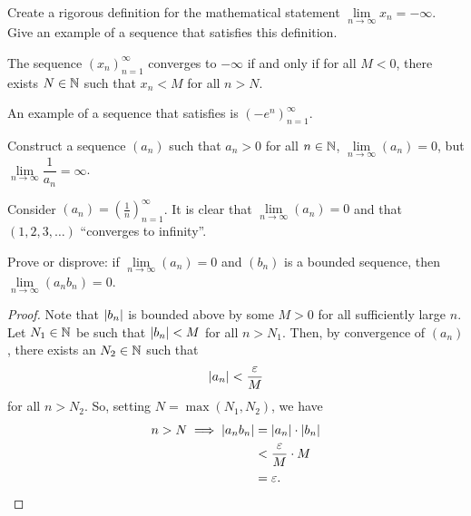 \begin{problem}
  Create a rigorous definition for the mathematical statement 
  $\lim\limits_{n \to \infty} x_{n} = -\infty$. Give an example of a 
  sequence that satisfies this definition. 

    \begin{definition}
      \label{def:convergence-to-neg-infty}
      The sequence $(x_{n})_{n=1}^{\infty}$ converges to $-\infty$ if and only if
      for all $M < 0$, there exists $N \in \mathbb{N}$ such that $x_{n} < M$ 
      for all $n > N$.
    \end{definition}

    An example of a sequence that satisfies  is
    $(-e^{n})_{n=1}^{\infty}$.
\end{problem}

\begin{problem}
  Construct a sequence $(a_{n})$ such that $a_{n} > 0$ for all $n \in \mathbb{N}$,
  $\lim\limits_{n \to \infty} (a_{n}) = 0$, but
  $\lim\limits_{n \to \infty} \dfrac{1}{a_{n}} = \infty$.

  \vspace{\baselineskip}

    Consider $(a_{n}) = \left( \frac{1}{n} \right)_{n=1}^{\infty}$. It is clear that
    $\lim\limits_{n \to \infty} (a_{n}) = 0$ and that $(1, 2, 3, \ldots)$ ``converges to infinity''.

\end{problem}

\begin{problem}
  Prove or disprove: if $\lim\limits_{n \to \infty} (a_{n}) = 0$ and $(b_{n})$ is
  a bounded sequence, then $\lim\limits_{n \to \infty} (a_{n}b_{n}) = 0$.

  \begin{proof} 
    Note that $\left\lvert b_{n} \right\rvert$ is bounded above by some $M > 0$ for all sufficiently large $n$.
    Let $N_{1} \in \mathbb{N}$ be such that $\left\lvert b_{n} \right\rvert < M$ for all $n > N_{1}$. Then, by convergence
    of $(a_{n})$, there exists an $N_{2} \in \mathbb{N}$ such that 
    \[
      \left\lvert a_{n} \right\rvert < \frac{\varepsilon}{M}
    \]
    for all $n > N_{2}$. So, setting $N = \max{(N_{1}, N_{2})}$, we have
    \begin{align*}
      n > N \implies \left\lvert a_{n}b_{n} \right\rvert &= \left\lvert a_{n} \right\rvert \cdot \left\lvert b_{n} \right\rvert \\
                                      &< \frac{\varepsilon}{M} \cdot M \\
                                      &= \varepsilon.
    \end{align*}
  \end{proof}

\end{problem}

